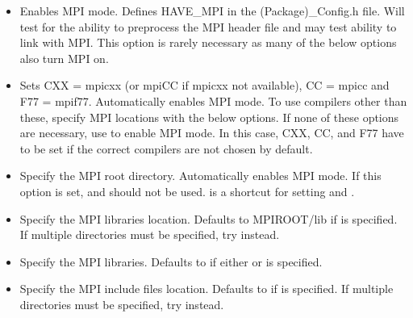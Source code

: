 \begin{itemize}
\item {}

Enables MPI mode. Defines HAVE\_MPI in the (Package)\_Config.h file. Will test 
for the ability to preprocess the MPI header file and may test ability to link 
with MPI.  This option is rarely necessary as many of the below options also 
turn MPI on.  

\item {}

Sets CXX = mpicxx (or mpiCC if mpicxx not available), CC = mpicc and 
F77 = mpif77.  Automatically enables MPI mode.  To use compilers other than 
these, specify MPI locations with the below options.  If none of these options 
are necessary, use  to enable MPI mode.  In this 
case, CXX, CC, and F77 have to be set if the correct compilers are 
not chosen by default.

\item {}

Specify the MPI root directory. Automatically enables MPI mode.  If this 
option is set,  and 
 should not be used.  
 is a shortcut for setting \newline
{} 
and \newline {}.

\item {}

Specify the MPI libraries location. Defaults to MPIROOT/lib if 
 is specified. If multiple directories must be 
specified, try \newline
{} instead. 

\item {} 

Specify the MPI libraries. Defaults to 
 if either or 
 is specified.

\item {}

Specify the MPI include files location. Defaults to  if 
 is specified. If multiple directories  must be specified, try 
\newline
{} instead.
\end{itemize}

